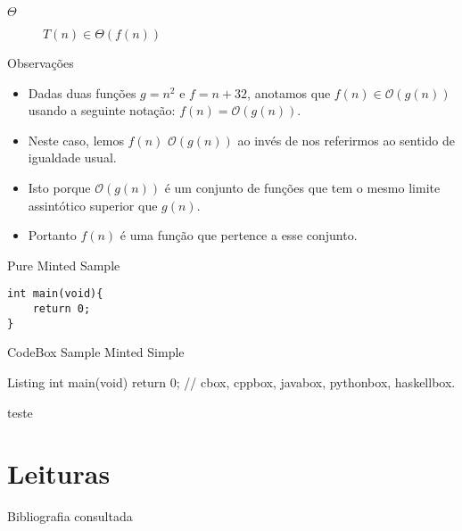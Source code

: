 \documentclass[
    mode=present,
    style=dvn,
    paper=screen,
    display=slidesnotes,
    size=14pt,
]{powerdot}
\begin{document}
\begin{slide}{$\Theta$}
    \begin{figure}
        
        \caption{$T(n){\in}\Theta(f(n))$}
    \end{figure}
\end{slide}

\begin{slide}{Observações}
    \begin{itemize}
        \item Dadas duas funções $g=n^2$ e $f=n + 32$, anotamos que $f(n){\in}\mathcal{O}(g(n))$ usando a seguinte notação: $f(n) = \mathcal{O}(g(n))$. 
        \item Neste caso, lemos $f(n)$  $\mathcal{O}(g(n))$ ao invés de nos referirmos ao sentido de igualdade usual.
        \item Isto porque $\mathcal{O}(g(n))$ é um conjunto de funções que tem o mesmo limite assintótico superior que $g(n)$.
        \item Portanto $f(n)$ é uma função que pertence a esse conjunto.
    \end{itemize}
\end{slide}

\begin{slide}[method=direct]{Pure Minted Sample}
    \begin{verbatim}
int main(void){
    return 0;
}
    \end{verbatim}
\end{slide}

\begin{slide}[method=direct]{CodeBox Sample Minted Simple}
    \begin{cbox}{Listing}
int main(void){
    return 0;
}
// cbox, cppbox, javabox, pythonbox, haskellbox.
    \end{cbox}{teste}
\end{slide}

\section{Leituras}

\begin{slide}{Bibliografia consultada}
    
    
\end{slide}
\end{document}
